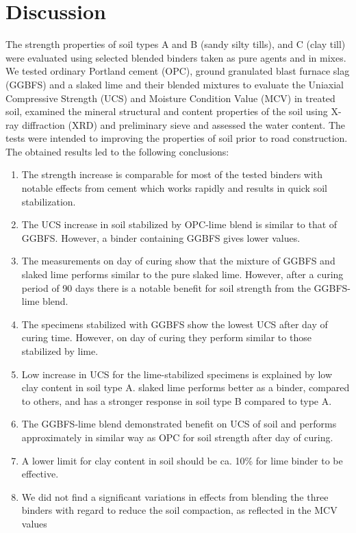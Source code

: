 \documentclass[electronics,article,submit,pdftex,moreauthors]{Definitions/mdpi}
\begin{document}
\section{Discussion}

The strength properties of soil types A and B (sandy silty tills), and C (clay till) were evaluated using selected blended binders taken as pure agents and in mixes. We tested ordinary Portland cement (OPC), ground granulated blast furnace slag (GGBFS) and a slaked lime and their blended mixtures to evaluate the Uniaxial Compressive Strength (UCS) and Moisture Condition Value (MCV) in treated soil, examined the mineral structural and content properties of the soil using X-ray diffraction (XRD) and preliminary sieve and assessed the water content. The tests were intended to improving the properties of soil prior to road construction. The obtained results led to the following conclusions:

\begin{enumerate}
   \item The strength increase is comparable for most of the tested binders with notable effects from cement which works rapidly and results in quick soil stabilization.
   \item The UCS increase in soil stabilized by OPC-lime blend is similar to that of GGBFS. However, a binder containing GGBFS gives lower values.  
   \item The measurements on day  of curing show that the mixture of GGBFS and slaked lime performs similar to the pure slaked lime. However,  after a curing period of 90 days there is a notable benefit for soil strength from the GGBFS-lime blend. 
   \item The specimens stabilized with GGBFS show the lowest UCS after  day of curing time. However, on  day of curing they perform similar to those stabilized by lime.
   \item Low increase in UCS for the lime-stabilized specimens is explained by low clay content in soil type A. slaked lime performs better as a binder, compared to others, and has a stronger response in soil type B compared to type A.
   \item The GGBFS-lime blend demonstrated benefit on UCS of soil and performs approximately in similar way as OPC for soil strength after  day of curing.	
   \item A lower limit for clay content in soil should be ca. 10\% for lime binder to be effective.
   \item We did not find a significant variations in effects from blending the three binders with regard to reduce the soil compaction, as reflected in the MCV values
 \end{enumerate}
\end{document}
